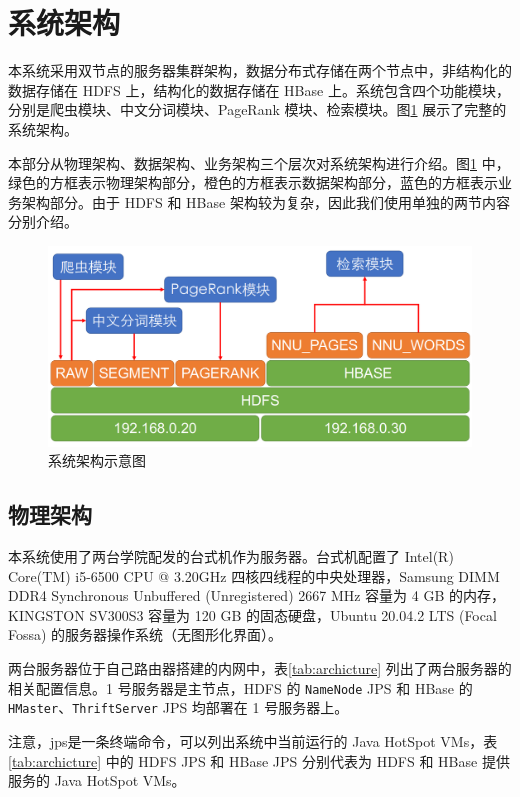 \documentclass{ctexart}
\newcommand{\code}[1]{\colorbox{backcolor}{\lstinline|#1|}}
\begin{document}
    \section{系统架构}\label{sec:archicture}

    本系统采用双节点的服务器集群架构，数据分布式存储在两个节点中，非结构化的数据存储在 HDFS 上，结构化的数据存储在 HBase 上。系统包含四个功能模块，分别是爬虫模块、中文分词模块、PageRank 模块、检索模块。图\ref{fig:archicture} 展示了完整的系统架构。

    本部分从物理架构、数据架构、业务架构三个层次对系统架构进行介绍。图\ref{fig:archicture} 中，绿色的方框表示物理架构部分，橙色的方框表示数据架构部分，蓝色的方框表示业务架构部分。由于 HDFS 和 HBase 架构较为复杂，因此我们使用单独的两节内容分别介绍。

    \begin{figure}[t]
        \centering
        \includegraphics[width=\textwidth]{src/archicture}
        \caption{系统架构示意图}
        \label{fig:archicture}
    \end{figure}

    \subsection{物理架构}\label{subsec:archicture_physics}
    本系统使用了两台学院配发的台式机作为服务器。台式机配置了 Intel(R) Core(TM) i5-6500 CPU @ 3.20GHz 四核四线程的中央处理器，Samsung DIMM DDR4 Synchronous Unbuffered (Unregistered) 2667 MHz 容量为 4 GB 的内存，KINGSTON SV300S3 容量为 120 GB 的固态硬盘，Ubuntu 20.04.2 LTS (Focal Fossa) 的服务器操作系统（无图形化界面）。

    两台服务器位于自己路由器搭建的内网中，表\ref{tab:archicture} 列出了两台服务器的相关配置信息。1 号服务器是主节点，HDFS 的 \code{NameNode} JPS 和 HBase 的 \code{HMaster}、\code{ThriftServer} JPS 均部署在 1 号服务器上。

    注意，jps是一条终端命令，可以列出系统中当前运行的 Java HotSpot VMs\cite{docs-jps}，表\ref{tab:archicture} 中的 HDFS JPS 和 HBase JPS 分别代表为 HDFS 和 HBase 提供服务的 Java HotSpot VMs。
\end{document}
